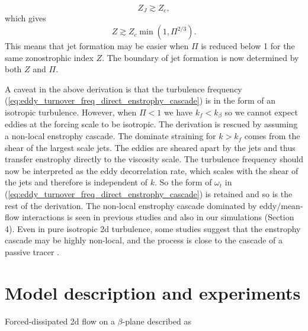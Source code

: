 \documentclass{ametsoc}
\begin{document}
\[
Z_{J}\apprge Z_{c},
\]
which gives
\[
Z\apprge Z_{c}\min(1,\Pi^{2/3}).
\]
This means that jet formation may be easier when $\Pi$ is reduced
below 1 for the same zonostrophic index $Z$. The boundary of jet
formation is now determined by both $Z$ and $\Pi$. 

A caveat in the above derivation is that the turbulence frequency (\ref{eq:eddy_turnover_freq_direct_enstrophy_cascade})
is in the form of an isotropic turbulence. However, when $\Pi<1$
we have $k_{f}<k_{\beta}$ so we cannot expect eddies at the forcing
scale to be isotropic. The derivation is rescued by assuming a non-local
enstrophy cascade. The dominate straining for $k>k_{f}$ comes from
the shear of the largest scale jets. The eddies are sheared apart
by the jets and thus transfer enstrophy directly to the viscosity
scale. The turbulence frequency should now be interpreted as the eddy
decorrelation rate, which scales with the shear of the jets and therefore
is independent of $k$. So the form of $\omega_{t}$ in (\ref{eq:eddy_turnover_freq_direct_enstrophy_cascade})
is retained and so is the rest of the derivation. The non-local enstrophy
cascade dominated by eddy/mean-flow interactions is seen in previous
studies \citep{Manz2009} and also in our simulations (Section 4).
Even in pure isotropic 2d turbulence, some studies suggest that the enstrophy
cascade may be highly non-local, and the process is close to the cascade
of a passive tracer \citep{Borue1993,Falkovich1994}.


\section{Model description and experiments}

Forced-dissipated 2d flow on a $\beta$-plane described as
\end{document}
